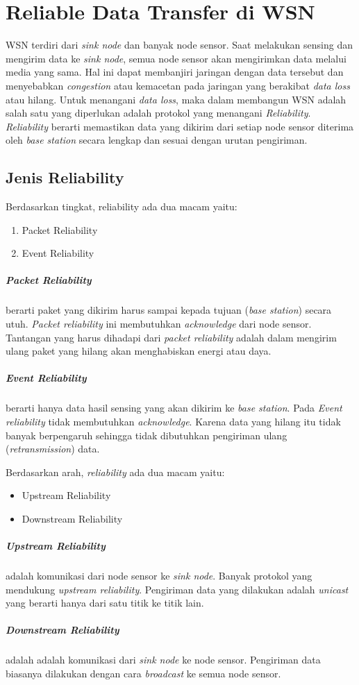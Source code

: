 \section{Reliable Data Transfer di WSN}
WSN terdiri dari \textit{sink node} dan banyak node sensor. Saat melakukan sensing dan mengirim data ke \textit{sink node}, semua node sensor akan mengirimkan data melalui media yang sama. Hal ini dapat membanjiri jaringan dengan data tersebut dan menyebabkan \textit{congestion} atau kemacetan pada jaringan yang berakibat \textit{data loss} atau hilang. Untuk menangani \textit{data loss}, maka dalam membangun WSN adalah salah satu yang diperlukan adalah protokol yang menangani \textit{Reliability}. \textit{Reliability} berarti memastikan data yang dikirim dari setiap node sensor diterima oleh \textit{base station} secara lengkap dan sesuai dengan urutan pengiriman.

\subsection{Jenis Reliability}
Berdasarkan tingkat, reliability ada dua macam yaitu:
\begin{enumerate}
	\item Packet Reliability
	\item Event Reliability
\end{enumerate}  
\subparagraph{Packet Reliability} berarti paket yang dikirim harus sampai kepada tujuan (\textit{base station}) secara utuh. \textit{Packet reliability} ini membutuhkan \textit{acknowledge} dari node sensor. Tantangan yang harus dihadapi dari \textit{packet reliability} adalah dalam mengirim ulang paket yang hilang akan menghabiskan energi atau daya.
\subparagraph{Event Reliability} berarti hanya data hasil sensing yang akan dikirim ke \textit{base station}. Pada \textit{Event reliability} tidak membutuhkan \textit{acknowledge}. Karena data yang hilang itu tidak banyak berpengaruh sehingga tidak dibutuhkan pengiriman ulang (\textit{retransmission}) data.


Berdasarkan arah, \textit{reliability} ada dua macam yaitu:
\begin{itemize}
	\item Upstream Reliability
	\item Downstream Reliability
\end{itemize}
\subparagraph{Upstream Reliability} adalah komunikasi dari node sensor ke \textit{sink node}. Banyak protokol yang mendukung \textit{upstream reliability}. Pengiriman data yang dilakukan adalah \textit{unicast} yang berarti hanya dari satu titik ke titik lain.
\subparagraph{Downstream Reliability} adalah adalah komunikasi dari \textit{sink node} ke node sensor. Pengiriman data biasanya dilakukan dengan cara \textit{broadcast} ke semua node sensor. 

